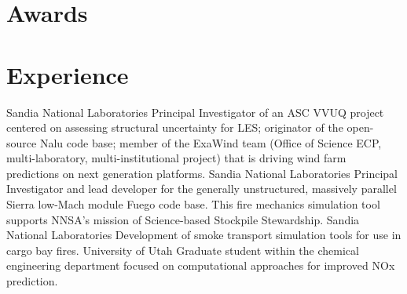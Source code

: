 \documentclass[letterpaper]{twentysecondcv_spd} %
\begin{document}
\section{Awards}

\begin{twentyshort} %
\end{twentyshort}


\section{Experience}

\begin{twenty} %
	 {Sandia National Laboratories} {Principal Investigator of an
ASC VVUQ project centered on assessing structural uncertainty for LES; originator of the open-source 
Nalu code base; member of the ExaWind team (Office of Science ECP, multi-laboratory, multi-institutional project) that is
driving wind farm predictions on next generation platforms.}
	 {Sandia National Laboratories}  {Principal Investigator
 and lead developer for the generally unstructured, massively parallel Sierra low-Mach module Fuego code base. This fire mechanics
simulation tool supports NNSA's mission of Science-based Stockpile Stewardship.}
	 {Sandia National Laboratories} {Development of smoke transport simulation
tools for use in cargo bay fires.}
	 {University of Utah} {Graduate student within the chemical engineering department
 focused on computational approaches for improved NOx prediction.}
\end{twenty}

\end{document}
